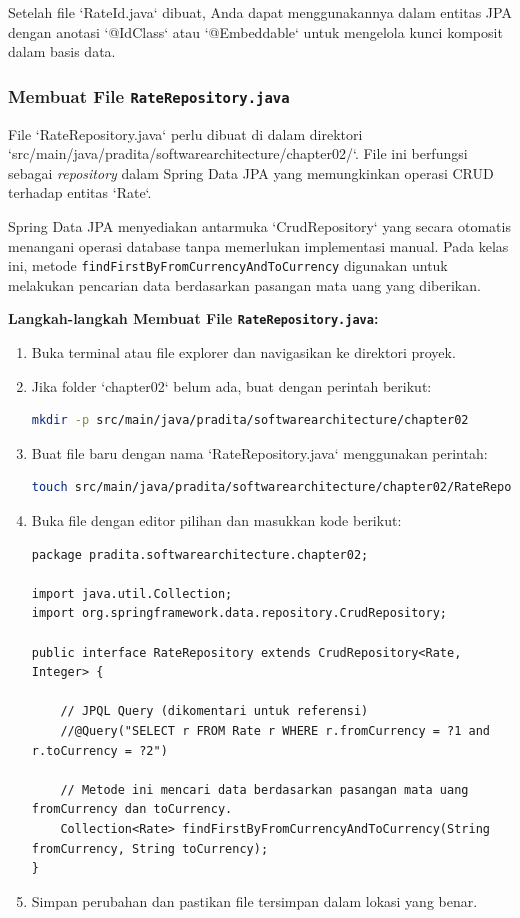 Setelah file `RateId.java` dibuat, Anda dapat menggunakannya dalam entitas JPA dengan anotasi `@IdClass` atau `@Embeddable` untuk mengelola kunci komposit dalam basis data.


\subsubsection{Membuat File \texttt{RateRepository.java}}
File `RateRepository.java` perlu dibuat di dalam direktori `src/main/java/pradita/softwarearchitecture/chapter02/`. File ini berfungsi sebagai \textit{repository} dalam Spring Data JPA yang memungkinkan operasi CRUD terhadap entitas `Rate`.

Spring Data JPA menyediakan antarmuka `CrudRepository` yang secara otomatis menangani operasi database tanpa memerlukan implementasi manual. Pada kelas ini, metode \texttt{findFirstByFromCurrencyAndToCurrency} digunakan untuk melakukan pencarian data berdasarkan pasangan mata uang yang diberikan.

\textbf{Langkah-langkah Membuat File \texttt{RateRepository.java}:}

\begin{enumerate}
\item Buka terminal atau file explorer dan navigasikan ke direktori proyek.
\item Jika folder `chapter02` belum ada, buat dengan perintah berikut:

\begin{lstlisting}[language=bash]
mkdir -p src/main/java/pradita/softwarearchitecture/chapter02
\end{lstlisting}

\item Buat file baru dengan nama `RateRepository.java` menggunakan perintah:

\begin{lstlisting}[language=bash]
touch src/main/java/pradita/softwarearchitecture/chapter02/RateRepository.java
\end{lstlisting}

\item Buka file dengan editor pilihan dan masukkan kode berikut:

\begin{lstlisting}[style=JavaStyle]
package pradita.softwarearchitecture.chapter02;

import java.util.Collection;
import org.springframework.data.repository.CrudRepository;

public interface RateRepository extends CrudRepository<Rate, Integer> {
	
	// JPQL Query (dikomentari untuk referensi)
	//@Query("SELECT r FROM Rate r WHERE r.fromCurrency = ?1 and r.toCurrency = ?2")
	
	// Metode ini mencari data berdasarkan pasangan mata uang fromCurrency dan toCurrency.
	Collection<Rate> findFirstByFromCurrencyAndToCurrency(String fromCurrency, String toCurrency);
}
\end{lstlisting}

\item Simpan perubahan dan pastikan file tersimpan dalam lokasi yang benar.
\end{enumerate}

